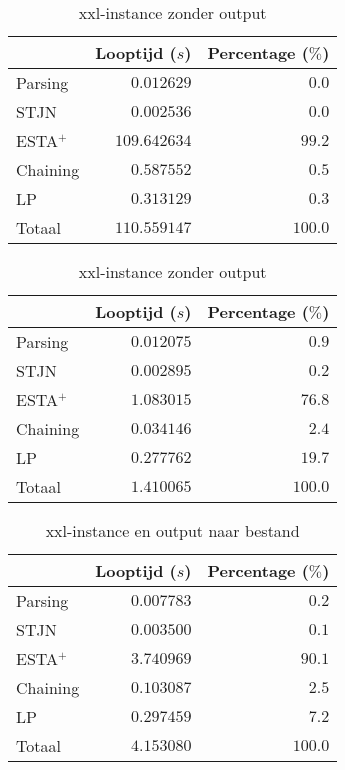 \begin{table}[H]
\parbox{.45\linewidth}{
    \centering
    \begin{tabular}{| l | r | r |}
        \hline
                    & Looptijd ($s$)  & Percentage ($\%$) \\
        \hline
        Parsing     & $0.012629$      & $0.0$   \\
        STJN        & $0.002536$      & $0.0$   \\
        ESTA$^+$    & $109.642634$    & $99.2$  \\
        Chaining    & $0.587552$      & $0.5$   \\
        LP          & $0.313129$      & $0.3$   \\
        \hline \hline
        Totaal      & $110.559147$    & $100.0$ \\
        \hline
    \end{tabular}
    \caption{xxl-instance met output}
    \label{tbl:xxl+output}
}
\hfill
\parbox{.45\linewidth}{
    \centering
    \begin{tabular}{| l | r | r |}
        \hline
                    & Looptijd ($s$)& Percentage ($\%$) \\
        \hline
        Parsing     & $0.012075$      & $0.9$   \\
        STJN        & $0.002895$      & $0.2$   \\
        ESTA$^+$    & $1.083015$      & $76.8$  \\
        Chaining    & $0.034146$      & $2.4$   \\
        LP          & $0.277762$      & $19.7$  \\
        \hline \hline
        Totaal      & $1.410065$      & $100.0$ \\
        \hline
    \end{tabular}
    \caption{xxl-instance zonder output}
    \label{tbl:xxl-output}
}
\end{table}

\begin{table}[H]
    \centering
    \begin{tabular}{| l | r | r|}
        \hline
                    & Looptijd ($s$)& Percentage ($\%$) \\
        \hline
        
        Parsing     & $0.007783$    & $0.2$     \\
        STJN        & $0.003500$    & $0.1$     \\
        ESTA$^+$    & $3.740969$    & $90.1$    \\
        Chaining    & $0.103087$    & $2.5$     \\
        LP          & $0.297459$    & $7.2$     \\
        \hline \hline
        Totaal      & $4.153080$    & $100.0$   \\
        \hline
    \end{tabular}
    \caption{xxl-instance en output naar bestand}
    \label{tbl:xxl+outputbestand}
\end{table}
